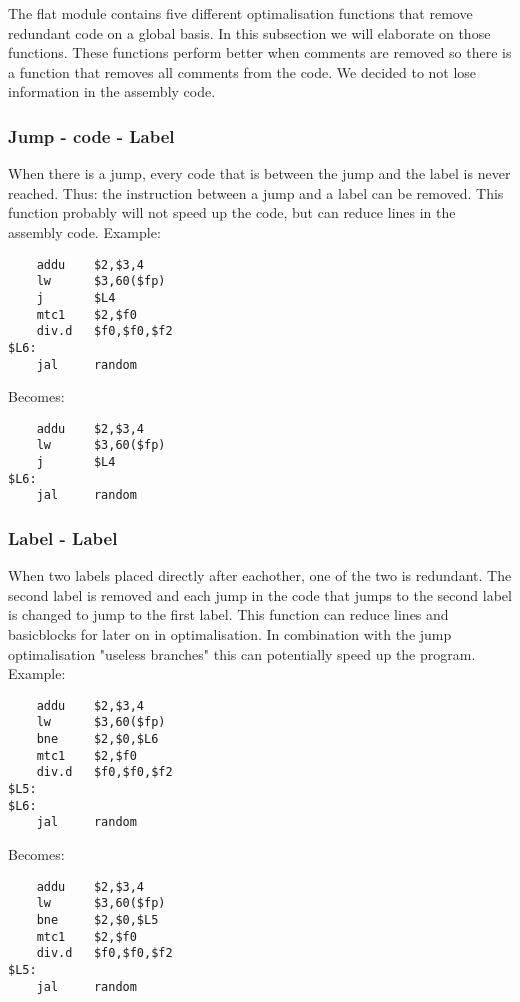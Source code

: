 
The flat module contains five different optimalisation functions that remove
redundant code on a global basis. In this subsection we will elaborate on those 
functions. These functions perform better when comments are removed so there is
a function that removes all comments from the code. We decided to not lose 
information in the assembly code.
\subsubsection{Jump - code - Label}
When there is a jump, every code that is between the jump and the label is 
never reached. Thus: the instruction between a jump and a label can be removed.
This function probably will not speed up the code, but can reduce
lines in the assembly code.
Example:
\begin{lstlisting}
    addu    $2,$3,4
    lw      $3,60($fp)
    j       $L4
    mtc1    $2,$f0
    div.d   $f0,$f0,$f2	
$L6:
    jal     random 
\end{lstlisting}
Becomes:
\begin{lstlisting}
    addu    $2,$3,4
    lw      $3,60($fp)
    j       $L4
$L6:
    jal	    random 
\end{lstlisting}
\subsubsection{Label - Label}
When two labels placed directly after eachother, one of the two is redundant.
The second label is removed and each jump in the code that jumps to the second 
label is changed to jump to the first label. This function can reduce lines and
basicblocks for later on in optimalisation. In combination with the jump 
optimalisation "useless branches" this can potentially speed up the program.
Example:
\begin{lstlisting}
    addu    $2,$3,4
    lw      $3,60($fp)
    bne     $2,$0,$L6
    mtc1    $2,$f0
    div.d   $f0,$f0,$f2	
$L5:
$L6:
    jal	    random 
\end{lstlisting}
Becomes:
\begin{lstlisting}
    addu    $2,$3,4
    lw      $3,60($fp)
    bne     $2,$0,$L5
    mtc1    $2,$f0
    div.d   $f0,$f0,$f2	
$L5:
    jal     random 
\end{lstlisting}
